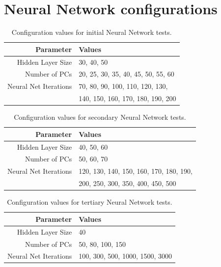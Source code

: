 \documentclass[11pt]{article} %
\begin{document}
\section{Neural Network configurations}
\label{sec:AppNNetConfig}

\begin{table}[h!]
\begin{center}
\begin{tabular}{rl}
Parameter & Values \\
\hline
Hidden Layer Size & 30, 40, 50\\
Number of PCs & 20, 25, 30, 35, 40, 45, 50, 55, 60\\
Neural Net Iterations & 70, 80, 90, 100, 110, 120, 130,\\
& 140, 150, 160, 170, 180, 190, 200\\
\hline
\end{tabular}
\caption{Configuration values for initial Neural Network tests.}
\label{nnet_parameters_init}
\end{center}
\end{table}


\begin{table}[h!]
\begin{center}
\begin{tabular}{rl}
Parameter & Values \\
\hline
Hidden Layer Size & 40, 50, 60\\
Number of PCs & 50, 60, 70\\
Neural Net Iterations &  120, 130, 140, 150, 160, 170, 180, 190,\\
& 200, 250, 300, 350, 400, 450, 500\\
\hline
\end{tabular}
\caption{Configuration values for secondary Neural Network tests.}
\label{nnet_parameters_second}
\end{center}
\end{table}


\begin{table}[h!]
\begin{center}
\begin{tabular}{rl}
Parameter & Values \\
\hline
Hidden Layer Size & 40\\
Number of PCs & 50, 80, 100, 150\\
Neural Net Iterations & 100, 300, 500, 1000, 1500, 3000\\
\hline
\end{tabular}
\caption{Configuration values for tertiary Neural Network tests.}
\label{nnet_parameters_third}
\end{center}
\end{table}
\end{document}
